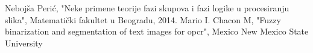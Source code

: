 \documentclass[12pt,a4paper]{article}
\theoremstyle{definition}
\theoremstyle{remark}
\theoremstyle{plain}
\begin{document}
\begin{thebibliography}{9}
  \bibitem{} Neboj\v sa Peri\' c, "Neke primene teorije fazi skupova i fazi logike u procesiranju slika", Matemati\v cki fakultet u Beogradu, 2014.
  \bibitem{} Mario I. Chacon M, "Fuzzy binarization and segmentation of text images for opcr", Mexico New Mexico State University
\end{thebibliography}
\end{document}
